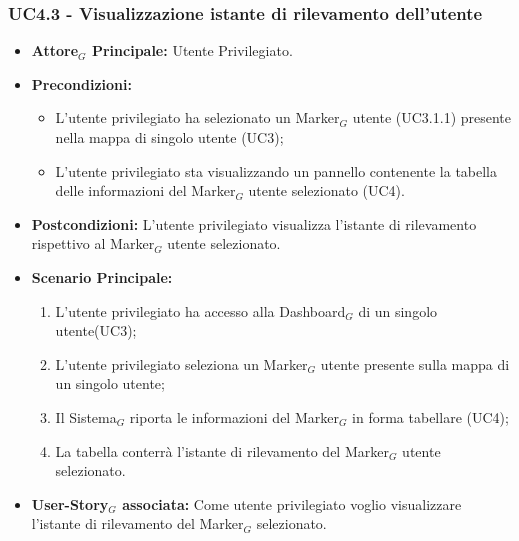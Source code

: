 \documentclass[10pt]{article}
\begin{document}
\begin{justify}
\subsubsection{\textbf{UC4.3 - Visualizzazione istante di rilevamento dell'utente}}
\label{UC4.3}
\begin{itemize}
     \item \textbf{Attore$_G$ Principale:} Utente Privilegiato.
     \item \textbf{Precondizioni:}
        \begin{itemize}
          \item L'utente privilegiato ha selezionato un Marker$_G$ utente (UC3.1.1) presente nella mappa di singolo utente (UC3);
          \item L'utente privilegiato sta visualizzando un pannello contenente la tabella delle informazioni del Marker$_G$ utente selezionato (UC4).
        \end{itemize}
      \item \textbf{Postcondizioni:} L'utente privilegiato visualizza l'istante di rilevamento rispettivo al Marker$_G$ utente selezionato. 
      \item \textbf{Scenario Principale:}
        \begin{enumerate}
            \item L'utente privilegiato ha accesso alla Dashboard$_G$ di un singolo utente(UC3);
            \item L'utente privilegiato seleziona un Marker$_G$ utente presente sulla mappa di un singolo utente;
            \item Il Sistema$_G$ riporta le informazioni del Marker$_G$ in forma tabellare (UC4);
            \item La tabella conterrà l'istante di rilevamento del Marker$_G$ utente selezionato.
        \end{enumerate}
     \item \textbf{User-Story$_G$ associata:}
       Come utente privilegiato voglio visualizzare l'istante di rilevamento del Marker$_G$ selezionato.
\end{itemize}

\end{justify}
\end{document}
